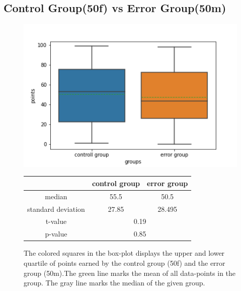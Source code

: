 \documentclass[runningheads]{llncs}
\begin{document}
\subsection{Control Group(50f) vs Error Group(50m)}
\begin{figure}
    \begin{minipage}{0.43\textwidth}        
        \includegraphics[width=\textwidth]{code/generate/all.png}
        \caption{The colored squares in the box-plot displays
        the upper and lower quartile of points earned by the control group (50f) and
        the error group (50m).The green line marks the mean of all data-points in the group.
        The gray line marks the median  of the given group.} \label{fig7}
    \end{minipage}
\hfill
\begin{minipage}{0.43\textwidth}
\begin{tabular}[]{| c | c | c |}
        \hline
        & control group & error group \\
        \hline
        median & 55.5&50.5 \\
        \hline
        standard deviation & 27.85&28.495 \\
        \hline
        t-value & \multicolumn{2}{c|}{0.19} \\
        \hline
        p-value & \multicolumn{2}{c|}{0.85} \\
        \hline            
\end{tabular}
\end{minipage}
\end{figure}
\clearpage
\end{document}
